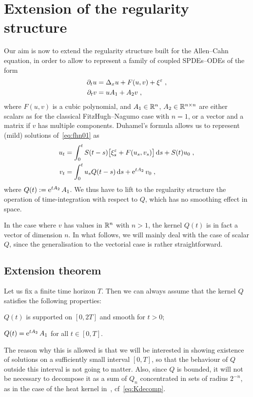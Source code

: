 \documentclass[reqno,11pt]{article}
\begin{document}
\section{Extension of the regularity structure}
\label{sec_extend}

Our aim is now to extend the regularity structure built for the Allen--Cahn
equation, in order to allow to represent a family of coupled SPDEs--ODEs of the
form 
\begin{align}
\nonumber
\partial_t u &= \Delta_x u + F(u,v) + \xi^\eps\;, \\
\partial_t v &=  u A_1 + A_2 v\;,
\label{eq:fhn01} 
\end{align} 
where $F(u,v)$ is a cubic polynomial, and $A_1\in \mathbb{R}^n$, $A_2\in \mathbb{R}^{n\times n}$
are either scalars as for the classical FitzHugh--Nagumo case with $n=1$, or a
vector and a matrix if $v$ has multiple components. Duhamel's formula allows us
to represent (mild) solutions of~\eqref{eq:fhn01} as 
\begin{align}
\nonumber
u_t &= \int_0^t S(t-s) \bigbrak{\xi^\eps_s + F(u_s,v_s)} \6s + S(t)u_0\;, \\
v_t &= \int_0^t u_s Q(t-s)  \6s + \e^{tA_2}v_0\;, 
\label{eq:fhn02} 
\end{align}
where $Q(t) := \operatorname{e}^{t A_2}A_1$. We thus have to lift to the regularity
structure the operation of time-integration with respect to $Q$, which has no
smoothing effect in space. 

In the case where $v$ has values in $\mathbb{R}^n$ with $n>1$, the kernel $Q(t)$ is in
fact a vector of dimension $n$. In what follows, we will mainly deal with the
case of scalar $Q$, since the generalisation to the vectorial case is rather
straightforward. 


\subsection{Extension theorem}
\label{ssec_ext}

Let us fix a finite time horizon $T$. Then we can always assume that the
kernel $Q$ satisfies the following properties:
\begin{itemizz}
\item 	$Q(t)$ is supported on $[0,2T]$ and smooth for $t>0$;
\item 	$Q(t) = \operatorname{e}^{tA_2}A_1$ for all $t\in[0,T]$.
\end{itemizz}
The reason why this is allowed is that we will be interested in showing
existence of solutions on a sufficiently small interval $[0,T]$, so that the
behaviour of $Q$ outside this interval is not going to matter. Also, since
$Q$ is bounded, it will not be necessary to decompose it as a sum of $Q_n$
concentrated in sets of radius $2^{-n}$, as in the case of the heat kernel
in~\cite[Section~5]{Hairer2014}, cf~\eqref{eq:Kdecomp}.
\end{document}
